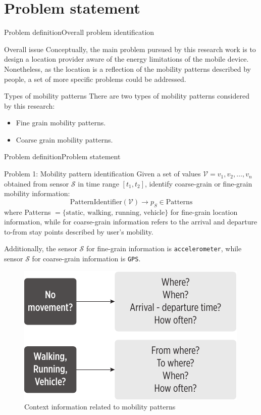 \documentclass[9pt,xcolor={dvipsnames},handout]{beamer}
\begin{document}
\section{Problem statement}
\begin{frame}{Problem definition}{Overall problem identification}
\begin{exampleblock}{Overall issue}
Conceptually, the main problem pursued by this research work is to design a location provider aware of the energy limitations of the mobile device.
Nonetheless, as the location is a reflection of the mobility patterns described by people, a set of more specific problems could be addressed.
\end{exampleblock}

\begin{exampleblock}{Types of mobility patterns}
There are two types of mobility patterns considered by this research:
\begin{itemize}
  \item Fine grain mobility patterns.
  \item Coarse grain mobility patterns.
\end{itemize}
\end{exampleblock}
\end{frame}

\begin{frame}{Problem definition}{Problem statement}
\begin{alertblock}{Problem 1: Mobility pattern identification}
Given a set of values $\mathcal{V} = v_1,v_2,\ldots,v_n$ obtained from sensor $\mathcal{S}$ in time range $[t_1,t_2]$, identify coarse-grain or fine-grain mobility information:
$$
\text{PatternIdentifier}(\mathcal{V}) \rightarrow p_S \in \text{Patterns}
$$
where Patterns  $ = \{ \text{static, walking, running, vehicle} \}$ for fine-grain location information, while for coarse-grain information refers to the arrival and departure to-from stay points described by user's mobility.

Additionally, the sensor $\mathcal{S}$ for fine-grain information is \texttt{accelerometer}, while sensor $\mathcal{S}$ for coarse-grain information is \texttt{GPS}.
\begin{figure}[tb]
  \centering
  \includegraphics[scale=0.5]{vectors/mobility-patterns-implications}
  \caption{Context information related to mobility patterns}
  \label{fig:mobility-patterns-implications}
\end{figure}
\end{alertblock}
\end{frame}
\end{document}
